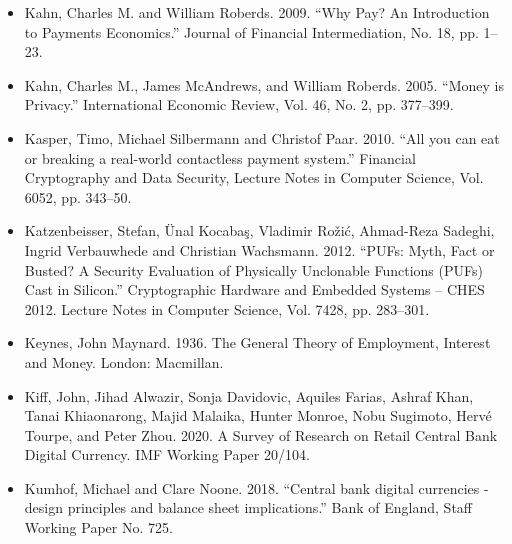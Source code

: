 \documentclass[10pt,spanish]{article}
\begin{document}
\begin{itemize}
\item Kahn, Charles M. and William Roberds. 2009. ``Why Pay? An Introduction
to Payments Economics.'' Journal of Financial Intermediation, No. 18,
pp. 1--23.
\end{itemize}

\begin{itemize}
\item Kahn, Charles M., James McAndrews, and William Roberds. 2005. ``Money is
Privacy.'' International Economic Review, Vol. 46, No. 2, pp. 377--399.
\end{itemize}

\begin{itemize}
\item Kasper, Timo, Michael Silbermann and Christof Paar. 2010. ``All you can
eat or breaking a real-world contactless payment system.'' Financial
Cryptography and Data Security, Lecture Notes in Computer Science, Vol.
6052, pp. 343--50.
\end{itemize}

\begin{itemize}
\item Katzenbeisser, Stefan, Ünal Kocabaş, Vladimir Rožić, Ahmad-Reza Sadeghi,
Ingrid Verbauwhede and Christian Wachsmann. 2012. ``PUFs: Myth, Fact or
Busted? A Security Evaluation of Physically Unclonable Functions (PUFs)
Cast in Silicon.'' Cryptographic Hardware and Embedded Systems -- CHES
2012. Lecture Notes in Computer Science, Vol. 7428, pp. 283--301.
\end{itemize}

\begin{itemize}
\item Keynes, John Maynard. 1936. The General Theory of Employment, Interest
and Money. London: Macmillan.
\end{itemize}

\begin{itemize}
\item Kiff, John, Jihad Alwazir, Sonja Davidovic, Aquiles Farias, Ashraf Khan,
Tanai Khiaonarong, Majid Malaika, Hunter Monroe, Nobu Sugimoto, Hervé
Tourpe, and Peter Zhou. 2020. A Survey of Research on Retail Central
Bank Digital Currency. IMF Working Paper 20/104.
\end{itemize}

\begin{itemize}
\item Kumhof, Michael and Clare Noone. 2018. ``Central bank digital currencies
- design principles and balance sheet implications.'' Bank of England,
Staff Working Paper No. 725.
\end{itemize}
\end{document}
